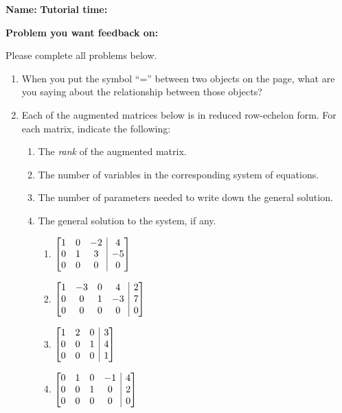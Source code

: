 \documentclass[12pt]{article}
\makeatletter
\newenvironment{amatrix}[1]{%
  \left[\begin{array}{@{}*{#1}{c}|c@{}}
}{%
  \end{array}\right]
}
\newcommand{\di}{\displaystyle}
\newcommand{\bam}{\begin{amatrix}}
\newcommand{\eam}{\end{amatrix}}
\makeatother
\begin{document}
{\bf \large Name:} \hspace{2.5in} {\bf Tutorial time:}

\bigskip

{\bf Problem you want feedback on:}

\bigskip

\thispagestyle{fancy}
Please complete all problems below.
 \begin{enumerate}
 \item When you put the symbol ``='' between two objects on the page, what are you saying about the relationship between those objects?

\vspace{0.5in}

 \item Each of the augmented matrices below is in reduced row-echelon form. For each matrix, indicate the following:

 \begin{enumerate}
  \item The {\em rank} of the augmented matrix.
  \item The number of variables in the corresponding system of equations.
  \item The number of parameters needed to write down the general solution.
  \item The general solution to the system, if any.
\begin{multicols}{2}
\begin{enumerate}
 \item $\di \bam{3} 1&0&-2&4\\0&1&3&-5\\0&0&0&0\eam$

\vspace{2in}

 \item $\di \bam{4} 1&-3&0&4&2\\0&0&1&-3&7\\0&0&0&0&0\eam$
 \item $\di \bam{3} 1&2&0&3\\0&0&1&4\\0&0&0&1\eam$

\vspace{2in}

 \item $\di \bam{4} 0&1&0&-1&4\\0&0&1&0&2\\0&0&0&0&0\eam$
\end{enumerate}
\end{multicols}
 \end{enumerate}


\end{enumerate}
\end{document}
